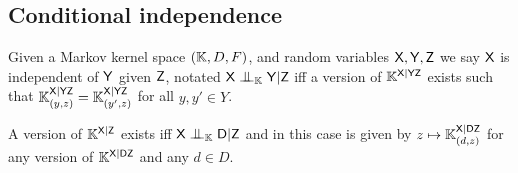 \subsection{Conditional independence}

Given a Markov kernel space $(\mathbb{K}, D, F)$, and random variables $\mathsf{X},\mathsf{Y}, \mathsf{Z}$ we say $\mathsf{X}$ is independent of $\mathsf{Y}$ given $\mathsf{Z}$, notated $\RV{X}\CI_{\kernel{K}} \RV{Y}|\RV{Z}$ iff a version of $\mathbb{K}^{\mathsf{X}|\mathsf{YZ}}$ exists such that $\mathbb{K}^{\mathsf{X}|\mathsf{YZ}}_{(y,z)} = \mathbb{K}^{\mathsf{X}|\mathsf{YZ}}_{(y',z)}$ for all $y,y'\in Y$.

A version of $\mathbb{K}^{\mathsf{X}|\mathsf{Z}}$ exists iff $\RV{X}\CI_{\kernel{K}} \RV{D}|\RV{Z}$ and in this case is given by $z\mapsto \mathbb{K}^{\mathsf{X}|\mathsf{DZ}}_{(d,z)}$ for any version of $\mathbb{K}^{\mathsf{X}|\mathsf{DZ}}$ and any $d\in D$.